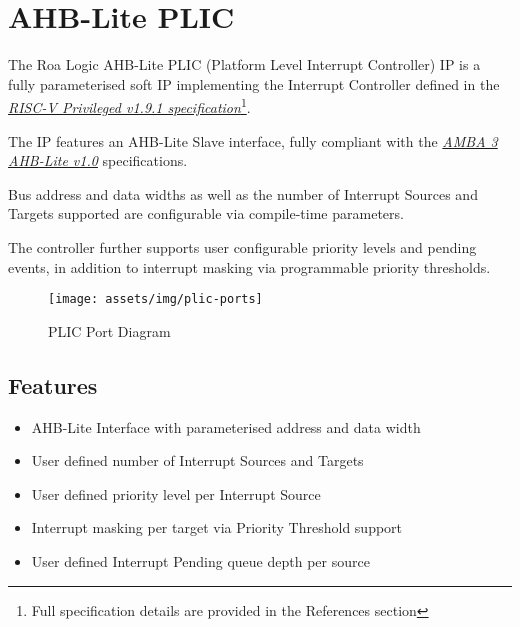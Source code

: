 \chapter{AHB-Lite PLIC}

The Roa Logic AHB-Lite PLIC (Platform Level Interrupt Controller) IP is a fully parameterised soft IP implementing the Interrupt Controller defined in the \emph{\href{https://github.com/riscv/riscv-isa-manual/blob/master/release/riscv-privileged-v1.9.1.pdf}{RISC-V Privileged v1.9.1 specification}}\footnote{Full specification details are provided in the References section}.

The IP features an AHB-Lite Slave interface, fully compliant with the \emph{\href{https://www.arm.com/products/system-ip/amba-specifications}{AMBA 3 AHB-Lite v1.0}} specifications. 

Bus address and data widths as well as the number of Interrupt Sources and Targets supported are configurable via compile-time parameters.

The controller further supports user configurable priority levels and pending events, in addition to interrupt masking via programmable priority thresholds.

\begin{figure}[!htb]
  \texttt{[image: assets/img/plic-ports]}
  \caption{PLIC Port Diagram}
  \label{fig:PORTDIAG}
\end{figure}

\section{Features}

\begin{itemize}
\item
AHB-Lite Interface with parameterised address and data width
\item
User defined number of Interrupt Sources and Targets
\item
User defined priority level per Interrupt Source
\item
Interrupt masking per target via Priority Threshold support
\item
User defined Interrupt Pending queue depth per source
\end{itemize}
